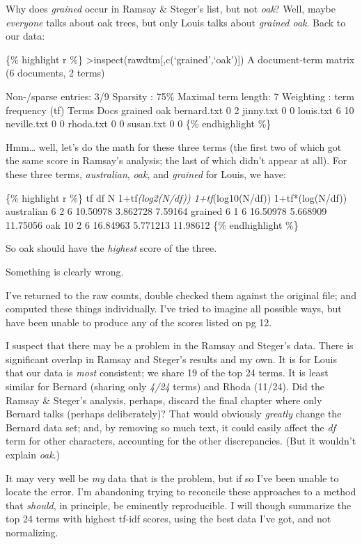 \documentclass[
  12pt,
]{article}
\begin{document}
Why does \emph{grained} occur in Ramsay \& Steger's list, but not
\emph{oak}? Well, maybe \emph{everyone} talks about oak trees, but only
Louis talks about \emph{grained oak}. Back to our data:

\{\% highlight r \%\}
\textgreater inspect(rawdtm{[},c(`grained',`oak'){]}) A document-term
matrix (6 documents, 2 terms)

Non-/sparse entries: 3/9 Sparsity : 75\% Maximal term length: 7
Weighting : term frequency (tf) Terms Docs grained oak bernard.txt 0 2
jinny.txt 0 0 louis.txt 6 10 neville.txt 0 0 rhoda.txt 0 0 susan.txt 0 0
\{\% endhighlight \%\}

Hmm\ldots{} well, let's do the math for these three terms (the first two
of which got the same score in Ramsay's analysis; the last of which
didn't appear at all). For these three terms, \emph{australian},
\emph{oak}, and \emph{grained} for Louis, we have:

\{\% highlight r \%\} tf df N 1+tf\emph{(log2(N/df)) 1+tf}(log10(N/df))
1+tf*(log(N/df)) australian 6 2 6 10.50978 3.862728 7.59164 grained 6 1
6 16.50978 5.668909 11.75056 oak 10 2 6 16.84963 5.771213 11.98612 \{\%
endhighlight \%\}

So oak should have the \emph{highest} score of the three.

Something is clearly wrong.

I've returned to the raw counts, double checked them against the
original file; and computed these things individually. I've tried to
imagine all possible ways, but have been unable to produce any of the
scores listed on pg 12.

I suspect that there may be a problem in the Ramsay and Steger's data.
There is significant overlap in Ramsay and Steger's results and my own.
It is for Louis that our data is \emph{most} consistent; we share 19 of
the top 24 terms. It is least similar for Bernard (sharing only
\emph{4/24} terms) and Rhoda (11/24). Did the Ramsay \& Steger's
analysis, perhaps, discard the final chapter where only Bernard talks
(perhaps deliberately)? That would obviously \emph{greatly} change the
Bernard data set; and, by removing so much text, it could easily affect
the \emph{df} term for other characters, accounting for the other
discrepancies. (But it wouldn't explain \emph{oak}.)

It may very well be \emph{my} data that is the problem, but if so I've
been unable to locate the error. I'm abandoning trying to reconcile
these approaches to a method that \emph{should}, in principle, be
eminently reproducible. I will though summarize the top 24 terms with
highest tf-idf scores, using the best data I've got, and not
normalizing.
\end{document}

